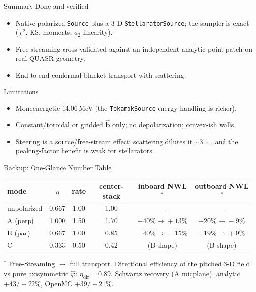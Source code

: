 \documentclass[11pt,aspectratio=169]{beamer}
\newcommand{\bhat}{\hat{\mathbf{b}}}
\begin{document}
\begin{frame}{Summary}
Done and verified
\begin{itemize}\footnotesize
\item Native polarized \texttt{Source} plus a 3-D \texttt{StellaratorSource}; the sampler is
      exact ($\chi^2$, KS, moments, $a_2$-linearity).
\item Free-streaming cross-validated against an independent analytic point-patch on real
      QUASR geometry.
\item End-to-end conformal blanket transport with scattering.
\end{itemize}
Limitations
\begin{itemize}\footnotesize
\item Monoenergetic 14.06\,MeV (the \texttt{TokamakSource} energy handling is richer).
\item Constant/toroidal or gridded $\bhat$ only; no depolarization; convex-ish walls.
\item Steering is a source/free-stream effect; scattering dilutes it $\sim3\times$, and the
      peaking-factor benefit is weak for stellarators.
\end{itemize}
\end{frame}

\begin{frame}{Backup: One-Glance Number Table}
\scriptsize
\begin{tabular}{@{}lccccc@{}}
\toprule
mode & $\eta$ & rate & center-stack & inboard NWL$^\ast$ & outboard NWL$^\ast$ \\
\midrule
unpolarized & 0.667 & 1.00 & 1.00 & --- & --- \\
A (perp) & 1.000 & 1.50 & 1.70 & $+40\%\!\to\!+13\%$ & $-20\%\!\to\!-9\%$ \\
B (par) & 0.667 & 1.00 & 0.85 & $-40\%\!\to\!-15\%$ & $+19\%\!\to\!+9\%$ \\
C & 0.333 & 0.50 & 0.42 & (B shape) & (B shape) \\
\bottomrule
\end{tabular}
\vfill
\footnotesize
$^\ast$ Free-Streaming $\to$ full transport. Directional efficiency of the pitched 3-D
field vs pure axisymmetric $\hat\varphi$: $\eta_{\text{dir}}=0.89$. Schwartz recovery
(A midplane): analytic $+43/-22\%$, OpenMC $+39/-21\%$.
\end{frame}
\end{document}

